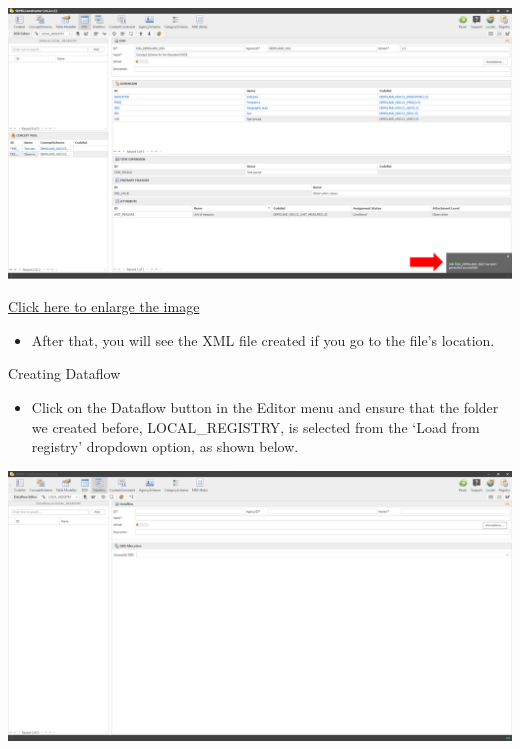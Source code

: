 \documentclass[
]{book}
\providecommand{\tightlist}{%
  \setlength{\itemsep}{0pt}\setlength{\parskip}{0pt}}
\begin{document}
\begin{center}\includegraphics[width=1\linewidth]{./images/image257} \end{center}

\href{images/image257.png}{Click here to enlarge the image}

\begin{itemize}
\tightlist
\item
  After that, you will see the XML file created if you go to the file's location.
\end{itemize}

Creating Dataflow

\begin{itemize}
\tightlist
\item
  Click on the Dataflow button in the Editor menu and ensure that the folder we created before, LOCAL\_REGISTRY, is selected from the `Load from registry' dropdown option, as shown below.
\end{itemize}

\begin{center}\includegraphics[width=1\linewidth]{./images/image258} \end{center}
\end{document}
